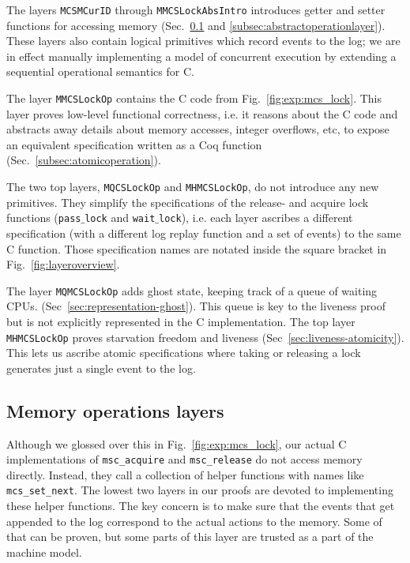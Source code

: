 The layers \texttt{MCSMCurID} through \texttt{MMCSLockAbsIntro}
introduces getter and setter functions for accessing memory
(Sec.~\ref{subsec:lowestmachinemodel} and
\ref{subsec:abstractoperationlayer}). These layers also
contain logical primitives which record events to the log; we are in
effect manually implementing a model of concurrent execution by
extending a sequential operational semantics for C. 

The layer \texttt{MMCSLockOp} contains the C code from 
Fig.~\ref{fig:exp:mcs_lock}. This layer proves low-level
functional correctness, i.e. it reasons about the C code and
abstracts away details about memory accesses, integer overflows, etc,
to expose an equivalent specification written as a Coq
function (Sec.~\ref{subsec:atomicoperation}).

The two top layers, \texttt{MQCSLockOp} and \texttt{MHMCSLockOp}, do not introduce any new primitives.
They simplify the specifications of 
the release- and acquire lock functions (\texttt{pass$\_$lock} and
\texttt{wait$\_$lock}), i.e. each layer ascribes a different
specification (with a different log replay function and a set of events)
to the same C function. Those specification names are notated inside the square bracket in Fig.~\ref{fig:layeroverview}.

The layer \texttt{MQMCSLockOp} adds ghost state, keeping track of a
queue of waiting CPUs.
(Sec~\ref{sec:representation-ghost}). This queue is key to the liveness proof but is not explicitly represented in the C implementation.
The top layer \texttt{MHMCSLockOp} proves starvation freedom and liveness
(Sec~\ref{sec:liveness-atomicity}). This lets us ascribe atomic
specifications where taking or releasing a lock generates just a
single event to the log.




\subsection{Memory operations layers}
\label{subsec:lowestmachinemodel}

Although we glossed over this in Fig.~\ref{fig:exp:mcs_lock}, our
actual C implementations of \lstinline$msc_acquire$ and
\lstinline$msc_release$ do not access memory directly.  Instead, they call
a collection of helper functions with names like
\lstinline$mcs_set_next$. The lowest two layers in our proofs
are devoted to implementing these helper functions.
The key concern is to make sure that the events that get appended to the log
correspond to the actual actions to the memory. Some of that can be proven, 
but some parts of this layer are trusted as a part of the machine model.

